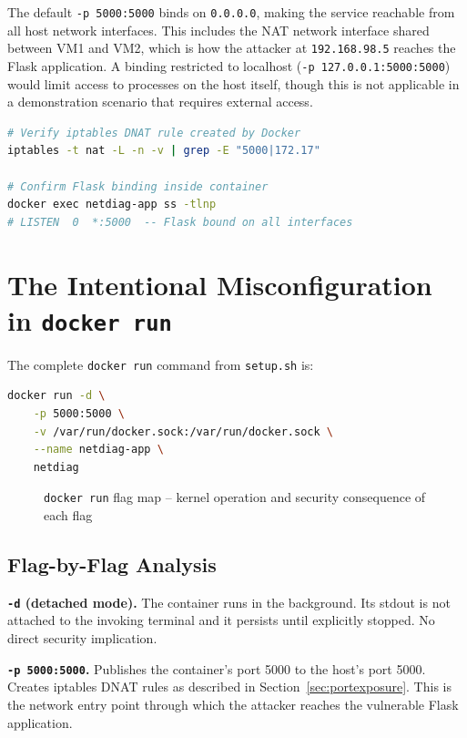 The default \texttt{-p 5000:5000} binds on \texttt{0.0.0.0}, making the service reachable from all host network interfaces. This includes the NAT network interface shared between VM1 and VM2, which is how the attacker at \texttt{192.168.98.5} reaches the Flask application. A binding restricted to localhost (\texttt{-p 127.0.0.1:5000:5000}) would limit access to processes on the host itself, though this is not applicable in a demonstration scenario that requires external access.

\begin{lstlisting}[language=bash]
# Verify iptables DNAT rule created by Docker
iptables -t nat -L -n -v | grep -E "5000|172.17"

# Confirm Flask binding inside container
docker exec netdiag-app ss -tlnp
# LISTEN  0  *:5000  -- Flask bound on all interfaces
\end{lstlisting}

\vspace{0.3cm}

\section{The Intentional Misconfiguration in \texttt{docker run}}
\label{sec:dockerrun}

The complete \texttt{docker run} command from \texttt{setup.sh} is:

\begin{lstlisting}[language=bash]
docker run -d \
    -p 5000:5000 \
    -v /var/run/docker.sock:/var/run/docker.sock \
    --name netdiag-app \
    netdiag
\end{lstlisting}

\begin{figure}[h]
\centering
\vspace{3.5cm}
\caption{\texttt{docker run} flag map -- kernel operation and security consequence of each flag}
\end{figure}

\subsection*{Flag-by-Flag Analysis}

\textbf{\texttt{-d} (detached mode).} The container runs in the background. Its stdout is not attached to the invoking terminal and it persists until explicitly stopped. No direct security implication.

\textbf{\texttt{-p 5000:5000}.} Publishes the container's port 5000 to the host's port 5000. Creates iptables DNAT rules as described in Section~\ref{sec:portexposure}. This is the network entry point through which the attacker reaches the vulnerable Flask application.

